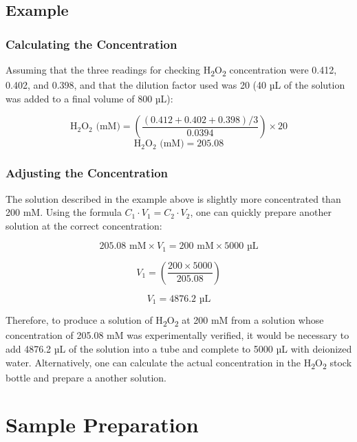 \documentclass[
  9pt,
  american,
  a5paper,
  extrafontsizes,onecolumn,openright
  ]{memoir}
\begin{document}
\subsection{Example}\label{example}

\subsubsection{Calculating the Concentration}\label{calculating-the-concentration}

\scriptsize

\normalsize

Assuming that the three readings for checking H\textsubscript{2}O\textsubscript{2} concentration were 0.412, 0.402, and 0.398, and that the dilution factor used was 20 (40 µL of the solution was added to a final volume of 800 µL):

\[\text{H}_2 \text{O}_2 \text{ (mM)} = \left( \frac{\left( 0.412 + 0.402 + 0.398 \right) / 3}{0.0394} \right) \times 20\]
\[\text{H}_2 \text{O}_2 \text{ (mM)} = 205.08\]

\subsubsection{Adjusting the Concentration}\label{adjusting-the-concentration}

The solution described in the example above is slightly more concentrated than 200 mM. Using the formula \(C_1 \cdot V_1 = C_2 \cdot V_2\), one can quickly prepare another solution at the correct concentration:

\[205.08 \text{ mM}\times V_1 = 200 \text{ mM} \times 5000 \text{ µL}\]

\[V_1 = \left( \frac{200 \times 5000}{205.08} \right)\]

\[V_1 = 4876.2 \text{ µL}\]

Therefore, to produce a solution of H\textsubscript{2}O\textsubscript{2} at 200 mM from a solution whose concentration of 205.08 mM was experimentally verified, it would be necessary to add 4876.2 µL of the solution into a tube and complete to 5000 µL with deionized water. Alternatively, one can calculate the actual concentration in the H\textsubscript{2}O\textsubscript{2} stock bottle and prepare a another solution.

\section{Sample Preparation}\label{sample_prep}
\end{document}
